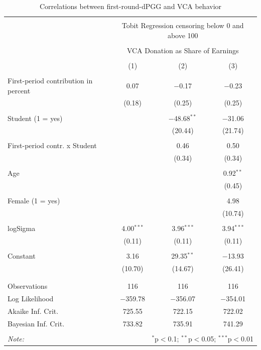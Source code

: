 \documentclass[
  authoryear,
  review,
  3p,
  onecolumn]{elsarticle}
\begin{document}
\hypertarget{tbl-tobit-generalizability}{}
\begin{table}[!htbp] \centering 
  \caption{\label{tbl-tobit-generalizability}Correlations between first-round-dPGG and VCA behavior } 
  \label{} 
\begin{tabular}{@{\extracolsep{5pt}}lccc} 
\\[-1.8ex]\hline 
\hline \\[-1.8ex] 
 & \multicolumn{3}{c}{Tobit Regression censoring below 0 and above 100} \\ 
\cline{2-4} 
\\[-1.8ex] & \multicolumn{3}{c}{VCA Donation as Share of Earnings} \\ 
\\[-1.8ex] & (1) & (2) & (3)\\ 
\hline \\[-1.8ex] 
 First-period contribution in percent & 0.07 & $-$0.17 & $-$0.23 \\ 
  & (0.18) & (0.25) & (0.25) \\ 
  & & & \\ 
 Student (1 = yes) &  & $-$48.68$^{**}$ & $-$31.06 \\ 
  &  & (20.44) & (21.74) \\ 
  & & & \\ 
 First-period contr. x Student &  & 0.46 & 0.50 \\ 
  &  & (0.34) & (0.34) \\ 
  & & & \\ 
 Age &  &  & 0.92$^{**}$ \\ 
  &  &  & (0.45) \\ 
  & & & \\ 
 Female (1 = yes) &  &  & 4.98 \\ 
  &  &  & (10.74) \\ 
  & & & \\ 
 logSigma & 4.00$^{***}$ & 3.96$^{***}$ & 3.94$^{***}$ \\ 
  & (0.11) & (0.11) & (0.11) \\ 
  & & & \\ 
 Constant & 3.16 & 29.35$^{**}$ & $-$13.93 \\ 
  & (10.70) & (14.67) & (26.41) \\ 
  & & & \\ 
\hline \\[-1.8ex] 
Observations & 116 & 116 & 116 \\ 
Log Likelihood & $-$359.78 & $-$356.07 & $-$354.01 \\ 
Akaike Inf. Crit. & 725.55 & 722.15 & 722.02 \\ 
Bayesian Inf. Crit. & 733.82 & 735.91 & 741.29 \\ 
\hline 
\hline \\[-1.8ex] 
\textit{Note:}  & \multicolumn{3}{r}{$^{*}$p$<$0.1; $^{**}$p$<$0.05; $^{***}$p$<$0.01} \\ 
\end{tabular} 
\end{table}
\end{document}
